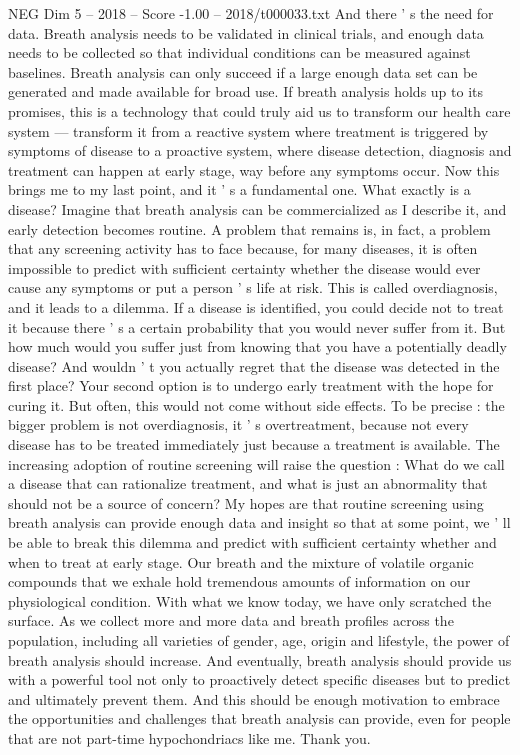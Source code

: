 \begin{textsample}{NEG Dim 5 – 2018 – Score -1.00 – 2018/t000033.txt}
And there ' s the need for data.
Breath analysis needs to be validated in clinical trials, and enough data needs to be collected so that individual conditions can be measured against baselines.
Breath analysis can only succeed if a large enough data set can be generated and made available for broad use.
If breath analysis holds up to its promises, this is a technology that could truly aid us to transform our health care system — transform it from a reactive system where treatment is triggered by symptoms of disease to a proactive system, where disease detection, diagnosis and treatment can happen at early stage, way before any symptoms occur.
Now this brings me to my last point, and it ' s a fundamental one.
What exactly is a disease?
Imagine that breath analysis can be commercialized as I describe it, and early detection becomes routine.
A problem that remains is, in fact, a problem that any screening activity has to face because, for many diseases, it is often impossible to predict with sufficient certainty whether the disease would ever cause any symptoms or put a person ' s life at risk.
This is called overdiagnosis, and it leads to a dilemma.
If a disease is identified, you could decide not to treat it because there ' s a certain probability that you would never suffer from it.
But how much would you suffer just from knowing that you have a potentially deadly disease?
And wouldn ' t you actually regret that the disease was detected in the first place?
Your second option is to undergo early treatment with the hope for curing it.
But often, this would not come without side effects.
To be precise : the bigger problem is not overdiagnosis, it ' s overtreatment, because not every disease has to be treated immediately just because a treatment is available.
The increasing adoption of routine screening will raise the question : What do we call a disease that can rationalize treatment, and what is just an abnormality that should not be a source of concern?
My hopes are that routine screening using breath analysis can provide enough data and insight so that at some point, we ' ll be able to break this dilemma and predict with sufficient certainty whether and when to treat at early stage.
Our breath and the mixture of volatile organic compounds that we exhale hold tremendous amounts of information on our physiological condition.
With what we know today, we have only scratched the surface.
As we collect more and more data and breath profiles across the population, including all varieties of gender, age, origin and lifestyle, the power of breath analysis should increase.
And eventually, breath analysis should provide us with a powerful tool not only to proactively detect specific diseases but to predict and ultimately prevent them.
And this should be enough motivation to embrace the opportunities and challenges that breath analysis can provide, even for people that are not part-time hypochondriacs like me.
Thank you.

\end{textsample}
